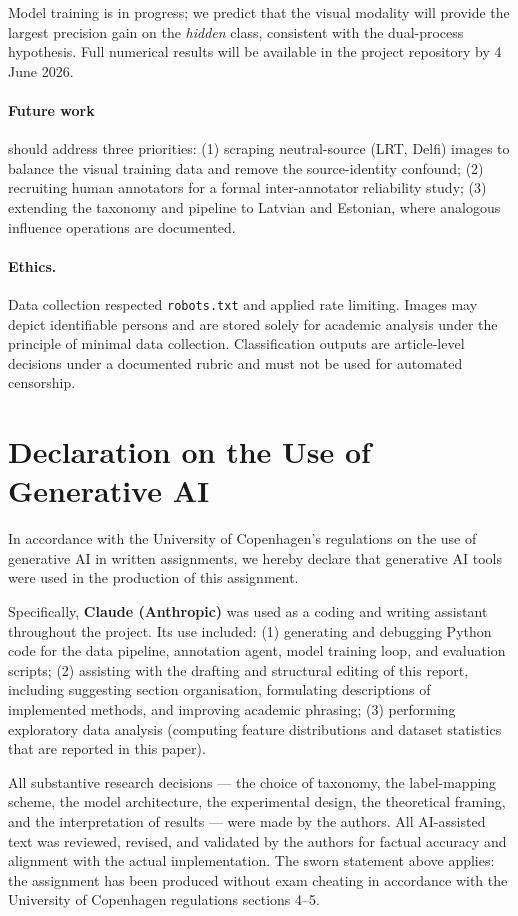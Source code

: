 \documentclass[12pt,a4paper]{article}
\begin{document}
Model training is in progress; we predict that the visual modality will
provide the largest precision gain on the \emph{hidden} class, consistent with
the dual-process hypothesis.
Full numerical results will be available in the project repository by 4 June
2026.

\paragraph{Future work} should address three priorities:
(1) scraping neutral-source (LRT, Delfi) images to balance the visual training
data and remove the source-identity confound;
(2) recruiting human annotators for a formal inter-annotator reliability study;
(3) extending the taxonomy and pipeline to Latvian and Estonian, where
analogous influence operations are documented.

\paragraph{Ethics.}
Data collection respected \texttt{robots.txt} and applied rate limiting.
Images may depict identifiable persons and are stored solely for academic
analysis under the principle of minimal data collection.
Classification outputs are article-level decisions under a documented rubric
and must not be used for automated censorship.

\printbibliography

\section*{Declaration on the Use of Generative AI}

In accordance with the University of Copenhagen's regulations on the use of
generative AI in written assignments, we hereby declare that generative AI
tools were used in the production of this assignment.

Specifically, \textbf{Claude (Anthropic)} was used as a coding and writing
assistant throughout the project.
Its use included: (1) generating and debugging Python code for the data
pipeline, annotation agent, model training loop, and evaluation scripts;
(2) assisting with the drafting and structural editing of this report,
including suggesting section organisation, formulating descriptions of
implemented methods, and improving academic phrasing;
(3) performing exploratory data analysis (computing feature distributions and
dataset statistics that are reported in this paper).

All substantive research decisions --- the choice of taxonomy, the
label-mapping scheme, the model architecture, the experimental design, the
theoretical framing, and the interpretation of results --- were made by the
authors.
All AI-assisted text was reviewed, revised, and validated by the authors for
factual accuracy and alignment with the actual implementation.
The sworn statement above applies: the assignment has been produced without
exam cheating in accordance with the University of Copenhagen regulations
sections 4--5.
\end{document}
